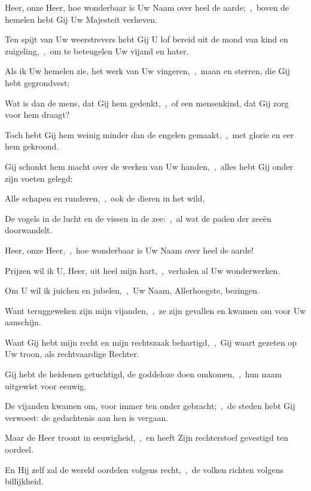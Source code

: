 \documentclass[12pt,twoside,a5paper]{article}
\begin{document}
\begin{halfparskip}

   Heer, onze Heer, hoe wonderbaar is Uw Naam over heel de aarde;~\sep\ boven de hemelen hebt Gij Uw Majesteit verheven.


  Ten spijt van Uw weerstrevers hebt Gij U lof bereid uit de mond van kind en zuigeling,~\sep\ om te beteugelen Uw vijand en hater.

  Als ik Uw hemelen zie, het werk van Uw vingeren,~\sep\ maan en sterren, die Gij hebt gegrondvest;

  Wat is dan de mens, dat Gij hem gedenkt,~\sep\ of een mensenkind, dat Gij zorg voor hem draagt?

  Toch hebt Gij hem weinig minder dan de engelen gemaakt,~\sep\ met glorie en eer hem gekroond.

  Gij schonkt hem macht over de werken van Uw handen,~\sep\ alles hebt Gij onder zijn voeten gelegd:

  Alle schapen en runderen,~\sep\ ook de dieren in het wild,

  De vogels in de lucht en de vissen in de zee:~\sep\ al wat de paden der zeeën doorwandelt.

  Heer, onze Heer,~\sep\ hoe wonderbaar is Uw Naam over heel de aarde!

   Prijzen wil ik U, Heer, uit heel mijn hart,~\sep\ verhalen al Uw wonderwerken.

  Om U wil ik juichen en jubelen,~\sep\ Uw Naam, Allerhoogste, bezingen.

  Want teruggeweken zijn mijn vijanden,~\sep\ ze zijn gevallen en kwamen om voor Uw aanschijn.

  Want Gij hebt mijn recht en mijn rechtszaak behartigd,~\sep\ Gij waart gezeten op Uw troon, als rechtvaardige Rechter.

  Gij hebt de heidenen getuchtigd, de goddeloze doen omkomen,~\sep\ hun naam uitgewist voor eeuwig.

  De vijanden kwamen om, voor immer ten onder gebracht;~\sep\ de steden hebt Gij verwoest: de gedachtenis aan hen is vergaan.

  Maar de Heer troont in eeuwigheid,~\sep\ en heeft Zijn rechterstoel gevestigd ten oordeel.

  En Hij zelf zal de wereld oordelen volgens recht,~\sep\ de volken richten volgens billijkheid.


\end{halfparskip}
\end{document}
